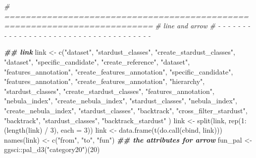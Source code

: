 \documentclass[
]{article}
\newenvironment{Shaded}{\begin{snugshade}}{\end{snugshade}}
\newcommand{\AttributeTok}[1]{\textcolor[rgb]{0.77,0.63,0.00}{#1}}
\newcommand{\CommentTok}[1]{\textcolor[rgb]{0.56,0.35,0.01}{\textit{#1}}}
\newcommand{\DecValTok}[1]{\textcolor[rgb]{0.00,0.00,0.81}{#1}}
\newcommand{\DocumentationTok}[1]{\textcolor[rgb]{0.56,0.35,0.01}{\textbf{\textit{#1}}}}
\newcommand{\FunctionTok}[1]{\textcolor[rgb]{0.00,0.00,0.00}{#1}}
\newcommand{\NormalTok}[1]{#1}
\newcommand{\OtherTok}[1]{\textcolor[rgb]{0.56,0.35,0.01}{#1}}
\newcommand{\SpecialCharTok}[1]{\textcolor[rgb]{0.00,0.00,0.00}{#1}}
\newcommand{\StringTok}[1]{\textcolor[rgb]{0.31,0.60,0.02}{#1}}
\begin{document}
\begin{Shaded}
\begin{Highlighting}[]
\CommentTok{\# ==========================================================================}
\CommentTok{\# line and arrow}
\CommentTok{\# {-} {-} {-} {-} {-} {-} {-} {-} {-} {-} {-} {-} {-} {-} {-} {-} {-} {-} {-} {-} {-} {-} {-} {-} {-} {-} {-} {-} {-} {-} {-} {-} {-} {-} {-} {-} {-}}

\DocumentationTok{\#\# link}
\NormalTok{link }\OtherTok{\textless{}{-}} \FunctionTok{c}\NormalTok{(}\StringTok{"dataset"}\NormalTok{, }\StringTok{"stardust\_classes"}\NormalTok{, }\StringTok{"create\_stardust\_classes"}\NormalTok{,}
          \StringTok{"dataset"}\NormalTok{, }\StringTok{"specific\_candidate"}\NormalTok{, }\StringTok{"create\_reference"}\NormalTok{,}
          \StringTok{"dataset"}\NormalTok{, }\StringTok{"features\_annotation"}\NormalTok{, }\StringTok{"create\_features\_annotation"}\NormalTok{,}
          \StringTok{"specific\_candidate"}\NormalTok{, }\StringTok{"features\_annotation"}\NormalTok{, }\StringTok{"create\_features\_annotation"}\NormalTok{,}
          \StringTok{"hierarchy"}\NormalTok{, }\StringTok{"stardust\_classes"}\NormalTok{, }\StringTok{"create\_stardust\_classes"}\NormalTok{,}
          \StringTok{"features\_annotation"}\NormalTok{, }\StringTok{"nebula\_index"}\NormalTok{, }\StringTok{"create\_nebula\_index"}\NormalTok{,}
          \StringTok{"stardust\_classes"}\NormalTok{, }\StringTok{"nebula\_index"}\NormalTok{, }\StringTok{"create\_nebula\_index"}\NormalTok{,}
          \StringTok{"stardust\_classes"}\NormalTok{, }\StringTok{"backtrack"}\NormalTok{, }\StringTok{"cross\_filter\_stardust"}\NormalTok{,}
          \StringTok{"backtrack"}\NormalTok{, }\StringTok{"stardust\_classes"}\NormalTok{, }\StringTok{"backtrack\_stardust"}
\NormalTok{)}
\NormalTok{link }\OtherTok{\textless{}{-}} \FunctionTok{split}\NormalTok{(link, }\FunctionTok{rep}\NormalTok{(}\DecValTok{1}\SpecialCharTok{:}\NormalTok{(}\FunctionTok{length}\NormalTok{(link) }\SpecialCharTok{/} \DecValTok{3}\NormalTok{), }\AttributeTok{each =} \DecValTok{3}\NormalTok{))}
\NormalTok{link }\OtherTok{\textless{}{-}} \FunctionTok{data.frame}\NormalTok{(}\FunctionTok{t}\NormalTok{(}\FunctionTok{do.call}\NormalTok{(cbind, link)))}
\FunctionTok{names}\NormalTok{(link) }\OtherTok{\textless{}{-}} \FunctionTok{c}\NormalTok{(}\StringTok{"from"}\NormalTok{, }\StringTok{"to"}\NormalTok{, }\StringTok{"fun"}\NormalTok{)}
\DocumentationTok{\#\# the attributes for arrow}
\NormalTok{fun\_pal }\OtherTok{\textless{}{-}}\NormalTok{ ggsci}\SpecialCharTok{::}\FunctionTok{pal\_d3}\NormalTok{(}\StringTok{"category20"}\NormalTok{)(}\DecValTok{20}\NormalTok{)}

\end{Highlighting}
\end{Shaded}
\end{document}
